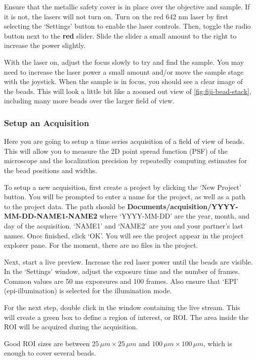 \documentclass[10pt,a4paper,oneside]{book}
\begin{document}
Ensure that the metallic safety cover is in place over the objective and sample. If it is not, the lasers will not turn on. Turn on the red 642 nm laser by first selecting the `Settings' button to enable the laser controls. Then, toggle the radio button next to the \textbf{red} slider. Slide the slider a small amount to the right to increase the power slightly.

With the laser on, adjust the focus slowly to try and find the sample. You may need to increase the laser power a small amount and/or move the sample stage with the joystick. When the sample is in focus, you should see a clear image of the beads. This will look a little bit like a zoomed out view of \autoref{fig:fiji-bead-stack}, including many more beads over the larger field of view.

\subsubsection{Setup an Acquisition}

Here you are going to setup a time series acquisition of a field of view of beads. This will allow you to measure the 2D point spread function (PSF) of the microscope and the localization precision by repeatedly computing estimates for the bead positions and widths.

To setup a new acquisition, first create a project by clicking the `New Project' button. You will be prompted to enter a name for the project, as well as a path to the project data. The path should be \textbf{Documents/acquisition/YYYY-MM-DD-NAME1-NAME2} where `YYYY-MM-DD' are the year, month, and day of the acquisition. `NAME1' and `NAME2' are you and your partner's last names. Once finished, click `OK'. You will see the project appear in the project explorer pane. For the moment, there are no files in the project.

Next, start a live preview. Increase the red laser power until the beads are visible. In the `Settings' window, adjust the exposure time and the number of frames. Common values are 50 ms exporsures and 100 frames. Also ensure that `EPI' (epi-illumination) is selected for the illumination mode.

For the next step, double click in the window containing the live stream. This will create a green box to define a region of interest, or ROI. The area inside the ROI will be acquired during the acquisition.

Good ROI sizes are between $25 \, \mu m\times 25 \, \mu m$ and $100 \, \mu m\times 100 \, \mu m$, which is enough to cover several beads.
\end{document}
